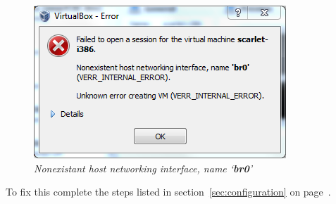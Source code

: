 \documentclass[pdftex,11pt,letterpaper]{article}
\begin{document}
    \begin{figure}[H]
        \begin{center}
        \leavevmode
            \includegraphics[]{scarlet_images/network_error.png}
        \end{center}
        \caption{\emph{Nonexistant host networking interface, name `\textbf{br0}'}}
        \label{fig:network_error}
    \end{figure}
    
To fix this complete the steps listed in section~\ref{sec:configuration} on page~\pageref{sec:configuration}.
\end{document}
